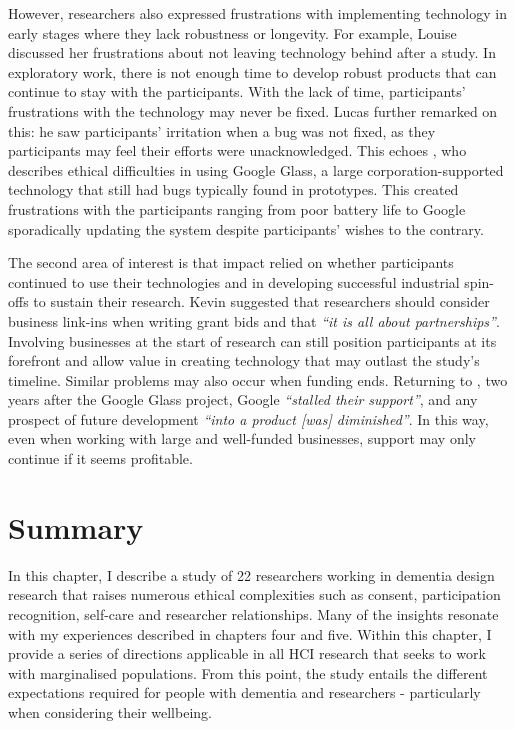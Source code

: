 However, researchers also expressed frustrations with implementing technology in early stages where they lack robustness or longevity. For example, Louise discussed her frustrations about not leaving technology behind after a study. In exploratory work, there is not enough time to develop robust products that can continue to stay with the participants. With the lack of time, participants' frustrations with the technology may never be fixed. Lucas further remarked on this: he saw participants' irritation when a bug was not fixed, as they participants may feel their efforts were unacknowledged. This echoes \cite{vines_our_2017}, who describes ethical difficulties in using Google Glass, a large corporation-supported technology that still had bugs typically found in prototypes. This created frustrations with the participants ranging from poor battery life to Google sporadically updating the system despite participants' wishes to the contrary. 

The second area of interest is that impact relied on whether participants continued to use their technologies and in developing successful industrial spin-offs to sustain their research. Kevin suggested that researchers should consider business link-ins when writing grant bids and that \textit{``it is all about partnerships''}. Involving businesses at the start of research can still position participants at its forefront and allow value in creating technology that may outlast the study’s timeline. Similar problems may also occur when funding ends. Returning to \cite{vines_our_2017}, two years after the Google Glass project, Google \textit{``stalled their support''}, and any prospect of future development \textit{``into a product [was] diminished''}. In this way, even when working with large and well-funded businesses, support may only continue if it seems profitable.

\section{Summary}
\label{Ethics:Summary}
In this chapter, I describe a study of 22 researchers working in dementia design research that raises numerous ethical complexities such as consent, participation recognition, self-care and researcher relationships. Many of the insights resonate with my experiences described in chapters four and five. Within this chapter, I provide a series of directions applicable in all HCI research that seeks to work with marginalised populations. From this point, the study entails the different expectations required for people with dementia and researchers - particularly when considering their wellbeing.

